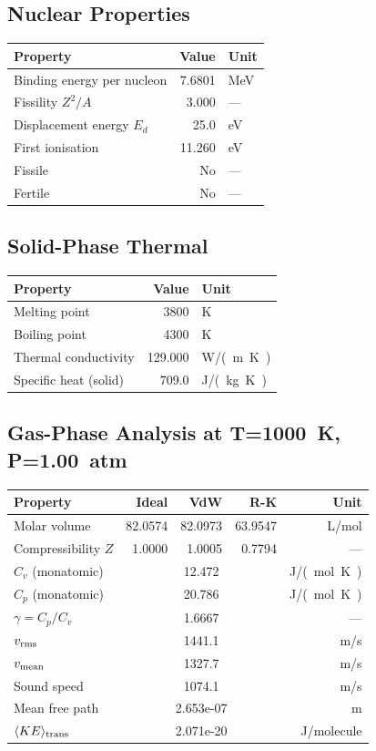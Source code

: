 \documentclass[11pt,a4paper]{article}
\begin{document}
\subsection{Nuclear Properties}
\begin{tabular}{lrl}
  \toprule
  Property & Value & Unit \\
  \midrule
  Binding energy per nucleon & 7.6801 & \si{MeV} \\
  Fissility $Z^2/A$ & 3.000 & --- \\
  Displacement energy $E_d$ & 25.0 & \si{eV} \\
  First ionisation & 11.260 & \si{eV} \\
  Fissile & No & --- \\
  Fertile & No & --- \\
  \bottomrule
\end{tabular}

\subsection{Solid-Phase Thermal}
\begin{tabular}{lrl}
  \toprule
  Property & Value & Unit \\
  \midrule
  Melting point & 3800 & \si{K} \\
  Boiling point & 4300 & \si{K} \\
  Thermal conductivity & 129.000 & \si{W/(m.K)} \\
  Specific heat (solid) & 709.0 & \si{J/(kg.K)} \\
  \bottomrule
\end{tabular}

\subsection{Gas-Phase Analysis at T=\SI{1000}{K}, P=\SI{1.00}{atm}}
\begin{tabular}{lrrrr}
  \toprule
  Property & Ideal & VdW & R-K & Unit \\
  \midrule
  Molar volume & 82.0574 & 82.0973 & 63.9547 & \si{L/mol} \\
  Compressibility $Z$ & 1.0000 & 1.0005 & 0.7794 & --- \\
  \midrule
  $C_v$ (monatomic) & \multicolumn{3}{c}{12.472} & \si{J/(mol.K)} \\
  $C_p$ (monatomic) & \multicolumn{3}{c}{20.786} & \si{J/(mol.K)} \\
  $\gamma = C_p/C_v$ & \multicolumn{3}{c}{1.6667} & --- \\
  $v_{\rm rms}$ & \multicolumn{3}{c}{1441.1} & \si{m/s} \\
  $v_{\rm mean}$ & \multicolumn{3}{c}{1327.7} & \si{m/s} \\
  Sound speed & \multicolumn{3}{c}{1074.1} & \si{m/s} \\
  Mean free path & \multicolumn{3}{c}{2.653e-07} & \si{m} \\
  $\langle KE \rangle_{\rm trans}$ & \multicolumn{3}{c}{2.071e-20} & \si{J/molecule} \\
  \bottomrule
\end{tabular}
\end{document}
